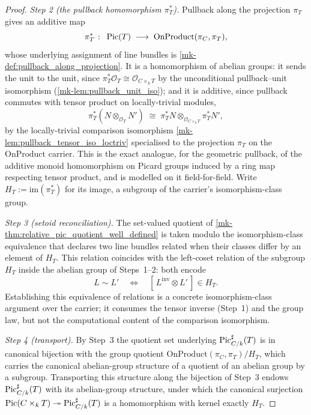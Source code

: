 \begin{proof}
  \emph{Step 2 (the pullback homomorphism \(\pi_T^*\)).} Pullback along the
  projection \(\pi_T\) gives an additive map
  \[
    \pi_T^* \;\colon\; \operatorname{Pic}(T) \;\longrightarrow\; \mathrm{OnProduct}(\pi_C, \pi_T),
  \]
  whose underlying assignment of line bundles is
  \ref{mk-def:pullback_along_projection}. It is a homomorphism of abelian groups:
  it sends the unit to the unit, since
  \(\pi_T^*\mathcal{O}_T \cong \mathcal{O}_{C \times_k T}\) by the unconditional
  pullback--unit isomorphism (\ref{mk-lem:pullback_unit_iso}); and it is additive,
  since pullback commutes with tensor product on locally-trivial modules,
  \[
    \pi_T^*(N \otimes_{\mathcal{O}_T} N') \;\cong\;
      \pi_T^* N \otimes_{\mathcal{O}_{C \times_k T}} \pi_T^* N',
  \]
  by the locally-trivial comparison isomorphism
  \ref{mk-lem:pullback_tensor_iso_loctriv} specialised to the projection
  \(\pi_T\) on the \(\mathrm{OnProduct}\) carrier. This is the exact analogue,
  for the geometric pullback, of the additive monoid homomorphism on Picard
  groups induced by a ring map respecting tensor product, and is modelled on it
  field-for-field. Write \(H_T := \mathrm{im}(\pi_T^*)\) for its image, a
  subgroup of the carrier's isomorphism-class group.

  \emph{Step 3 (setoid reconciliation).} The set-valued quotient of
  \ref{mk-thm:relative_pic_quotient_well_defined} is taken modulo the
  isomorphism-class equivalence that declares two line bundles related when
  their classes differ by an element of \(H_T\). This relation coincides with
  the left-coset relation of the subgroup \(H_T\) inside the abelian group of
  Steps~1--2: both encode
  \[
    L \sim L' \quad\Longleftrightarrow\quad
      [\, L^{\mathrm{inv}} \otimes L' \,] \in H_T .
  \]
  Establishing this equivalence of relations is a concrete isomorphism-class
  argument over the carrier; it consumes the tensor inverse (Step~1) and the
  group law, but not the computational content of the comparison isomorphism.

  \emph{Step 4 (transport).} By Step~3 the quotient set underlying
  \(\operatorname{Pic}^\sharp_{C/k}(T)\) is in canonical bijection with the group quotient
  \(\mathrm{OnProduct}(\pi_C, \pi_T) / H_T\), which carries the canonical
  abelian-group structure of a quotient of an abelian group by a subgroup.
  Transporting this structure along the bijection of Step~3 endows
  \(\operatorname{Pic}^\sharp_{C/k}(T)\) with its abelian-group structure, under which the
  canonical surjection
  \(\operatorname{Pic}(C \times_k T) \twoheadrightarrow \operatorname{Pic}^\sharp_{C/k}(T)\) is a
  homomorphism with kernel exactly \(H_T\).
\end{proof}

